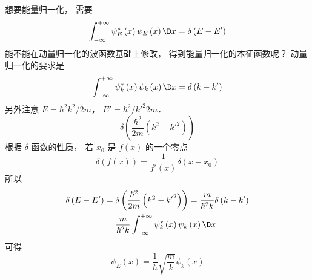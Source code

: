 

想要能量归一化， 需要
 \begin{equation}
  \int_{ - \infty }^{ + \infty } {\psi _E^ * \left( x \right){\psi _E}\left( x \right)\D x}  = \delta \left( {E - E'} \right)
\end{equation}
能不能在动量归一化的波函数基础上修改， 得到能量归一化的本征函数呢？
动量归一化的要求是
 \begin{equation}
  \int_{ - \infty }^{ + \infty } {\psi _k^ * \left( x \right){\psi _k}\left( x \right)\D x}  = \delta \left( {k - k'} \right)
\end{equation}
另外注意 $E = {{{\hbar ^2}{k^2}}}/{{2m}}$，   $E' = {{{\hbar ^2}/{{k'}^2}}}{{2m}}$． 
 \begin{equation}
  \delta \left( {\frac{{{\hbar ^2}}}{{2m}}\left( {{k^2} - {{k'}^2}} \right)} \right)
\end{equation}
根据 $\delta $ 函数的性质， 若 ${x_0}$ 是 $f\left( x \right)$ 的一个零点
 \begin{equation}
  \delta \left( {f\left( x \right)} \right) = \frac{1}{{f'\left( x \right)}}\delta \left( {x - {x_0}} \right)
\end{equation}
所以
 \begin{equation}
 \begin{aligned}
\delta \left( {E - E'} \right)& = \delta \left( {\frac{{{\hbar ^2}}}{{2m}}\left( {{k^2} - {{k'}^2}} \right)} \right) = \frac{m}{{{\hbar ^2}k}}\delta \left( {k - k'} \right) \\
&= \frac{m}{{{\hbar ^2}k}}\int_{ - \infty }^{ + \infty } {\psi _k^ * \left( x \right){\psi _k}\left( x \right)\D x} 
 \end{aligned}
\end{equation}
可得
 \begin{equation}
  {\psi _E}\left( x \right) = \frac{1}{\hbar }\sqrt {\frac{m}{k}} {\psi _k}\left( x \right)
\end{equation}

